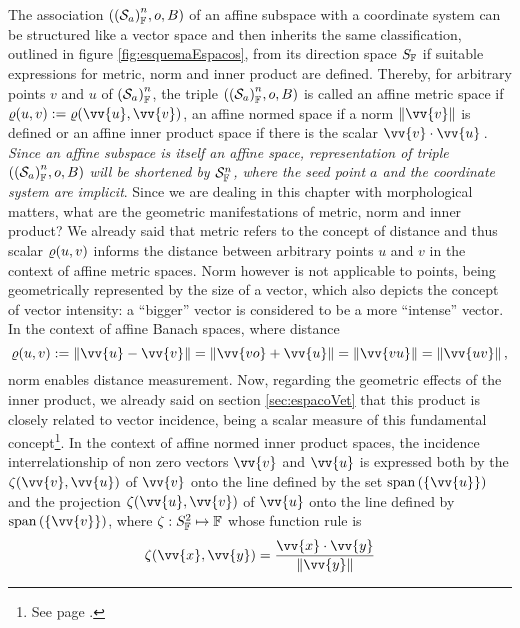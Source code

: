 The association $(\eamsd{S}{F}{a}{n},o,B)$ of an affine subspace with a coordinate system can be structured like a vector space and then inherits the same classification, outlined in figure \ref{fig:esquemaEspacos}, from its direction space $S_\cam{F}$ if suitable expressions for metric, norm and inner product are defined. Thereby, for arbitrary points $v$ and $u$ of $\eamsd{S}{F}{a}{n}$, the triple $(\eamsd{S}{F}{a}{n},o,B)$ is called an affine metric space if $\fua{\varrho}{u,v}:=\fua{\varrho}{\vv{u},\vv{v}}$, an affine normed space if a norm $\|\vv{v}\|$ is defined or an affine inner product space if there is the scalar $\vv{v}\cdot\vv{u}\,$. \emph{Since an affine subspace is itself an affine space, representation of triple $(\eamsd{S}{F}{a}{n},o,B)$ will be shortened by $\eamd{S}{F}{n}$, where the seed point $a$ and the coordinate system are implicit}. Since we are dealing in this chapter with morphological matters, what are the geometric manifestations of metric, norm and inner product? We already said that metric refers to the concept of distance and thus scalar $\fua{\varrho}{u,v}$ informs the distance between arbitrary points $u$ and $v$ in the context of affine metric spaces. Norm however is not applicable to points, being geometrically represented by the size of a vector, which also depicts the concept of vector intensity: a ``bigger'' vector is considered to be a more ``intense'' vector. In the context of affine Banach spaces, where distance
\begin{equation}\label{eq:affDistance}
\fua{\varrho}{u,v} := \|\vv{u} - \vv{v}\|=\|\vv{vo} + \vv{u}\|=\|\vv{vu}\|=\|\vv{uv}\|\,,
\end{equation}
norm enables distance measurement. Now, regarding the geometric effects of the inner product, we already said on section \ref{sec:espacoVet} that this product is closely related to vector incidence, being a scalar measure of this fundamental concept\footnote{See page \pageref{sec:incidence}.}. In the context of affine normed inner product spaces, the incidence interrelationship of non zero vectors $\vv{v}$ and $\vv{u}$ is expressed both by the  $\fua{\zeta}{\vv{v},\vv{u}}$ of $\vv{v}$ onto the line defined by the set $\spn{(\{\vv{u}\})}$ and the projection $\fua{\zeta}{\vv{u},\vv{v}}$ of $\vv{u}$ onto the line defined by $\spn{(\{\vv{v}\})}$, where $\map{\zeta}{S_\cam{F}^2}{\cam{F}}$ whose function rule is
\begin{equation}\label{eq:projection}
\fua{\zeta}{\vv{x},\vv{y}}=\dfrac{\vv{x}\cdot \vv{y}}{\|\vv{y}\|}
\end{equation}

